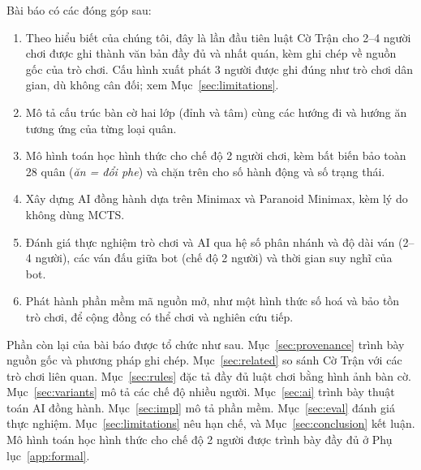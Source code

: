 Bài báo có các đóng góp sau:
\begin{enumerate}[label=(\roman*)]
  \item Theo hiểu biết của chúng tôi, đây là lần đầu tiên luật Cờ Trận cho
        2--4 người chơi được ghi thành văn bản đầy đủ và nhất quán, kèm
        ghi chép về nguồn gốc của trò chơi. Cấu hình xuất phát 3 người được
        ghi đúng như trò chơi dân gian, dù không cân đối; xem
        Mục~\ref{sec:limitations}.
  \item Mô tả cấu trúc bàn cờ hai lớp (đỉnh và tâm) cùng các hướng đi và
        hướng ăn tương ứng của từng loại quân.
  \item Mô hình toán học hình thức cho chế độ 2 người chơi, kèm
        bất biến bảo toàn 28 quân (\emph{ăn = đổi phe}) và chặn trên cho
        số hành động và số trạng thái.
  \item Xây dựng AI đồng hành dựa trên Minimax và Paranoid Minimax, kèm
        lý do không dùng MCTS.
  \item Đánh giá thực nghiệm trò chơi và AI qua hệ số phân nhánh và độ
        dài ván (2--4 người), các ván đấu giữa bot (chế độ 2 người) và thời
        gian suy nghĩ của bot.
  \item Phát hành phần mềm mã nguồn mở, như một hình thức số hoá và bảo
        tồn trò chơi, để cộng đồng có thể chơi và nghiên cứu tiếp.
\end{enumerate}

Phần còn lại của bài báo được tổ chức như sau. Mục~\ref{sec:provenance}
trình bày nguồn gốc và phương pháp ghi chép. Mục~\ref{sec:related} so sánh
Cờ Trận với các trò chơi liên quan. Mục~\ref{sec:rules} đặc tả đầy đủ luật
chơi bằng hình ảnh bàn cờ. Mục~\ref{sec:variants} mô tả các chế độ nhiều
người. Mục~\ref{sec:ai} trình bày thuật toán AI đồng hành.
Mục~\ref{sec:impl} mô tả phần mềm. Mục~\ref{sec:eval} đánh giá thực
nghiệm. Mục~\ref{sec:limitations} nêu hạn chế, và
Mục~\ref{sec:conclusion} kết luận. Mô hình toán học hình thức cho chế độ
2 người được trình bày đầy đủ ở Phụ lục~\ref{app:formal}.
